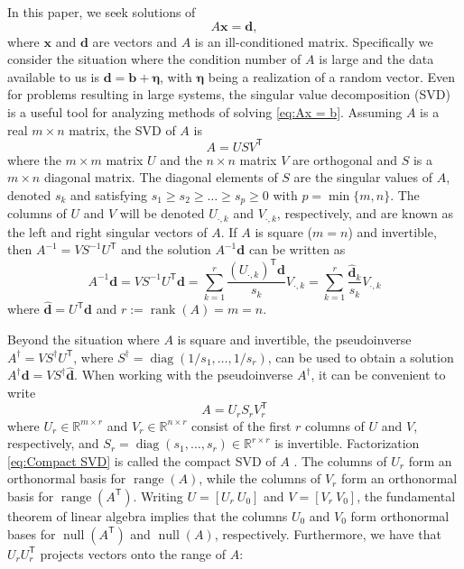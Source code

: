 \documentclass[12pt]{article}
\newcommand{\bVec}{\mathbf{b}}	%
\newcommand{\dVec}{\mathbf{d}}	%
\newcommand{\xVec}{\mathbf{x}}	%
\newcommand{\trans}[1]{{#1}^\mathsf{T}}	%
\newcommand{\inv}[1]{{#1}^{-1}}	%
\newcommand{\pinv}[1]{{#1}^\dagger}	%
\DeclareMathOperator{\diag}{diag}	%
\DeclareMathOperator{\rank}{rank}	%
\DeclareMathOperator{\range}{range}	%
\DeclareMathOperator{\nullspace}{null}	%
\newcommand{\noise}{\eta}	%
\newcommand{\noiseVec}{\bm{\noise}}	%
\newcommand{\singular}{s}	%
\newcommand{\svd}[1]{\widehat{#1}}	%
\begin{document}
In this paper, we seek solutions of 
\begin{equation}
\label{eq:Ax = b}
A\xVec = \dVec,
\end{equation}
where $\xVec$ and $\dVec$ are vectors and $A$ is an ill-conditioned matrix. Specifically we consider the situation where the condition number of $A$ is large and the data available to us is $\dVec = \bVec + \noiseVec$, with $\noiseVec$ being a realization of a random vector. Even for problems resulting in large systems, the singular value decomposition (SVD) is a useful tool for analyzing methods of solving \eqref{eq:Ax = b}.  Assuming $A$ is a real $m \times n$ matrix, the SVD of $A$ is
\begin{equation}
\label{eq:SVD}
A = US\trans{V}
\end{equation}
where the $m \times m$ matrix $U$ and the $n \times n$ matrix $V$ are orthogonal and $S$ is a $m \times n$ diagonal matrix. The diagonal elements of $S$ are the singular values of $A$, denoted $\singular_k$ and satisfying $\singular_1 \geq \singular_2 \geq \ldots \geq \singular_{p} \geq 0$ with $p = \min\{m,n\}$. The columns of $U$ and $V$ will be denoted $U_{\cdot,k}$ and $V_{\cdot,k}$, respectively, and are known as the left and right singular vectors of $A$. If $A$ is square ($m = n$) and invertible, then $\inv{A} = V\inv{S}\trans{U}$ and the solution $\inv{A}\dVec$ can be written as
\begin{equation}
\label{eq:InvProd}
\inv{A}\dVec = VS^{-1}{\trans{U}}\dVec = \sum_{k=1}^{r} \frac{{\trans{(U_{\cdot,k})}}\dVec}{\singular_k}V_{\cdot,k} = \sum_{k=1}^{r} \frac{\svd{\dVec}_k}{\singular_k}V_{\cdot,k}
\end{equation}
where $\svd{\dVec} = \trans{U}\dVec$ and $r := \rank(A) = m = n$. \par 
Beyond the situation where $A$ is square and invertible, the pseudoinverse $\pinv{A} = V\pinv{S}\trans{U}$, where $\pinv{S} = \diag(1/\singular_1,\ldots,1/\singular_{r})$, can be used to obtain a solution $\pinv{A}\dVec = V\pinv{S}\svd{\dVec}$. When working with the pseudoinverse $\pinv{A}$, it can be convenient to write
\begin{equation}
\label{eq:Compact SVD}
A = U_rS_r\trans{V}_r
\end{equation}
where $U_r \in \mathbb{R}^{m \times r}$ and $V_r \in \mathbb{R}^{n \times r}$ consist of the first $r$ columns of $U$ and $V$, respectively, and $S_r = \diag(\singular_1,\ldots,\singular_{r}) \in \mathbb{R}^{r \times r}$ is invertible. Factorization \eqref{eq:Compact SVD} is called the compact SVD of $A$ \cite{ABT,Leon2010}. The columns of $U_r$ form an orthonormal basis for $\range(A)$, while the columns of $V_r$ form an orthonormal basis for $\range(\trans{A})$. Writing $U = [U_r ~ U_0]$ and $V = [V_r ~ V_0]$, the fundamental theorem of linear algebra \cite{Strang1993} implies that the columns $U_0$  and $V_0$ form orthonormal bases for $\nullspace(\trans{A})$ and $\nullspace(A)$, respectively. Furthermore, we have that $U_r\trans{U}_r$ projects vectors onto the range of $A$:
\end{document}
